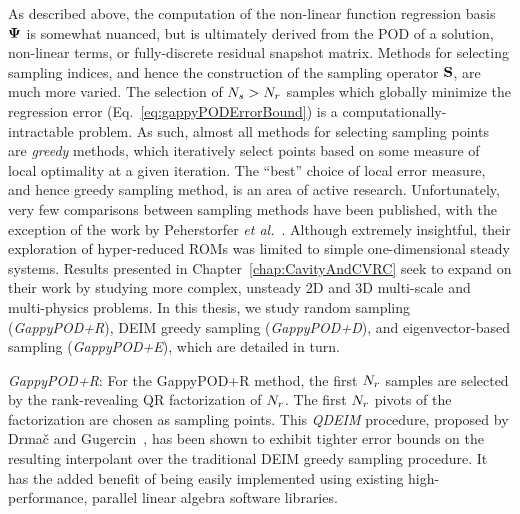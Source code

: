 As described above, the computation of the non-linear function regression basis $\deimBasis$ is somewhat nuanced, but is ultimately derived from the POD of a solution, non-linear terms, or fully-discrete residual snapshot matrix. Methods for selecting sampling indices, and hence the construction of the sampling operator $\mathbf{S}$, are much more varied. The selection of $N_s > N_r$ samples which globally minimize the regression error (Eq.~\ref{eq:gappyPODErrorBound}) is a computationally-intractable problem. As such, almost all methods for selecting sampling points are \textit{greedy} methods, which iteratively select points based on some measure of local optimality at a given iteration. The ``best'' choice of local error measure, and hence greedy sampling method, is an area of active research. Unfortunately, very few comparisons between sampling methods have been published, with the exception of the work by Peherstorfer \textit{et al.}~\cite{Peherstorfer2020}. Although extremely insightful, their exploration of hyper-reduced ROMs was limited to simple one-dimensional steady systems. Results presented in Chapter~\ref{chap:CavityAndCVRC} seek to expand on their work by studying more complex, unsteady 2D and 3D multi-scale and multi-physics problems. In this thesis, we study random sampling (\textit{GappyPOD+R}), DEIM greedy sampling (\textit{GappyPOD+D}), and eigenvector-based sampling (\textit{GappyPOD+E}), which are detailed in turn.

\vspace{0.5cm}
\noindent \textit{GappyPOD+R}:
For the GappyPOD+R method, the first $N_r$ samples are selected by the rank-revealing QR factorization of $N_r$. The first $N_r$ pivots of the factorization are chosen as sampling points. This \textit{QDEIM} procedure, proposed by Drma\v{c} and Gugercin~\cite{Drmac2016}, has been shown to exhibit tighter error bounds on the resulting interpolant over the traditional DEIM greedy sampling procedure. It has the added benefit of being easily implemented using existing high-performance, parallel linear algebra software libraries.

